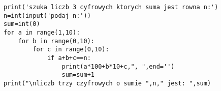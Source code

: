 \begin{verbatim}
print('szuka liczb 3 cyfrowych ktorych suma jest rowna n:')
n=int(input('podaj n:'))
sum=int(0)
for a in range(1,10):
    for b in range(0,10):
        for c in range(0,10):
            if a+b+c==n:
                print(a*100+b*10+c,", ",end='')
                sum=sum+1
print("\nliczb trzy czyfrowych o sumie ",n," jest: ",sum)
\end{verbatim}